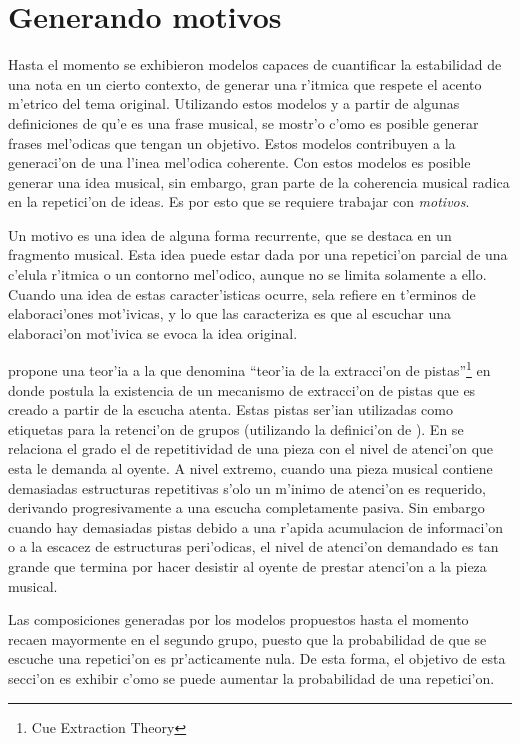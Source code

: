 \section{Generando motivos}
Hasta el momento se exhibieron modelos capaces de cuantificar la estabilidad de una nota en un cierto contexto, de generar una r'itmica que
respete el acento m'etrico del tema original. Utilizando estos modelos y a partir de algunas definiciones de qu'e es una frase musical, se mostr'o c'omo es posible
generar frases mel'odicas que tengan un objetivo. Estos modelos contribuyen a la generaci'on de una l'inea mel'odica coherente. Con estos modelos es posible
generar una idea musical, sin embargo, gran parte de la coherencia musical radica en la repetici'on de ideas. Es por esto que se requiere trabajar con \emph{motivos}. 

Un motivo es una idea de alguna forma recurrente, que se destaca en un fragmento musical. Esta idea puede estar dada por una repetici'on parcial de una c'elula 
r'itmica o un contorno mel'odico, aunque no se limita solamente a ello. Cuando una idea de estas caracter'isticas ocurre, sela refiere en t'erminos
de elaboraci'ones mot'ivicas, y lo que las caracteriza es que al escuchar una elaboraci'on mot'ivica se evoca la idea original.

\cite{Deliege87} propone una teor'ia a la que denomina ``teor'ia de la extracci'on de pistas''\footnote{Cue Extraction Theory} en donde postula la existencia de un mecanismo de 
extracci'on de pistas 
que es creado a partir de la escucha atenta. Estas pistas ser'ian utilizadas como etiquetas para la retenci'on de grupos (utilizando la definici'on de 
\cite{LerdahlJackendoff83}). En \cite{Deliege90} se relaciona el grado el
de repetitividad de una pieza con el nivel de atenci'on que esta le demanda al oyente. A nivel extremo, cuando una pieza musical contiene demasiadas estructuras 
repetitivas s'olo un m'inimo de atenci'on es requerido, derivando progresivamente a una escucha completamente pasiva. Sin embargo cuando hay demasiadas 
pistas debido a una r'apida acumulacion de informaci'on o a la escacez de estructuras peri'odicas, el nivel de atenci'on demandado es tan grande que 
termina por hacer desistir al oyente de prestar atenci'on a la pieza musical.

Las composiciones generadas por los modelos propuestos hasta el momento recaen mayormente en el segundo grupo, puesto que la probabilidad de que se escuche
una repetici'on es pr'acticamente nula. De esta forma, el objetivo de esta secci'on es exhibir c'omo se puede aumentar la probabilidad de una repetici'on.



